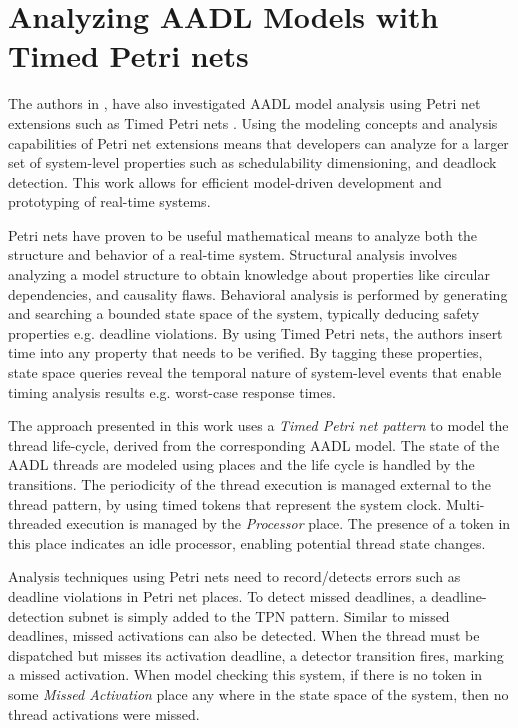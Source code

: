 \section{Analyzing AADL Models with Timed Petri nets}

The authors in \cite{kordon_sn}, have also investigated AADL model analysis
using Petri net extensions such as Timed Petri nets \cite{kordon2009}. Using the
modeling concepts and analysis capabilities of Petri net extensions means that
developers can analyze for a larger set of system-level properties such as
schedulability dimensioning, and deadlock detection. This work allows for
efficient model-driven development and prototyping of real-time systems.

Petri nets have proven to be useful mathematical means to analyze both the
structure and behavior of a real-time system. Structural analysis involves
analyzing a model structure to obtain knowledge about properties like circular
dependencies, and causality flaws. Behavioral analysis is performed by
generating and searching a bounded state space of the system, typically deducing
safety properties e.g. deadline violations. By using Timed Petri nets, the
authors insert time into any property that needs to be verified. By tagging
these properties, state space queries reveal the temporal nature of system-level
events that enable timing analysis results e.g. worst-case response times.

The approach presented in this \cite{kordon2009} work uses a \emph{Timed Petri
net pattern} to model the thread life-cycle, derived from the corresponding AADL
model. The state of the AADL threads are modeled using places and the life cycle
is handled by the transitions. The periodicity of the thread execution is
managed external to the thread pattern, by using timed tokens that represent the
system clock. Multi-threaded execution is managed by the \emph{Processor} place.
The presence of a token in this place indicates an idle processor, enabling
potential thread state changes.

Analysis techniques using Petri nets need to record/detects errors such as
deadline violations in Petri net places. To detect missed deadlines, a
deadline-detection subnet is simply added to the TPN pattern. Similar to missed
deadlines, missed activations can also be detected. When the thread must be
dispatched but misses its activation deadline, a detector transition fires,
marking a missed activation. When model checking this system, if there is no
token in some \emph{Missed Activation} place any where in the state space of the
system, then no thread activations were missed.

